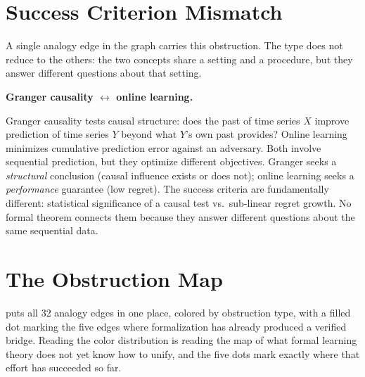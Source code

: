 
\section{Success Criterion Mismatch}
\label{sec:criterion-mismatch}

A single analogy edge in the graph carries this obstruction. The type does not
reduce to the others: the two concepts share a setting and a procedure, but
they answer different questions about that setting.

\begin{obstbox}
\textbf{Granger causality $\leftrightarrow$ online learning.}

\medskip\noindent
Granger causality tests causal structure: does the past of time series
$X$ improve prediction of time series $Y$ beyond what $Y$'s own past
provides? Online learning minimizes cumulative prediction error against
an adversary. Both involve sequential prediction, but they optimize
different objectives. Granger seeks a \emph{structural} conclusion
(causal influence exists or does not); online learning seeks a
\emph{performance} guarantee (low regret). The success criteria are
fundamentally different: statistical significance of a causal test vs.\
sub-linear regret growth. No formal theorem connects them because they
answer different questions about the same sequential data.
\end{obstbox}



\section{The Obstruction Map}
\label{sec:obstruction-map}

 puts all 32 analogy edges in one place, colored
by obstruction type, with a filled dot marking the five edges where
formalization has already produced a verified bridge. Reading the color
distribution is reading the map of what formal learning theory does not yet
know how to unify, and the five dots mark exactly where that effort has
succeeded so far.

